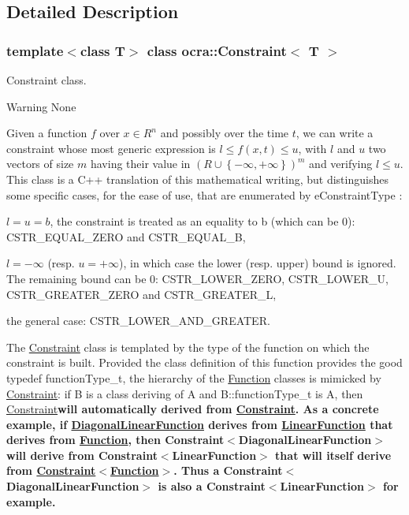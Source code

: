 \subsection{Detailed Description}
\subsubsection*{template$<$class T$>$\newline
class ocra\+::\+Constraint$<$ T $>$}

Constraint class. 

\begin{DoxyWarning}{Warning}
None
\end{DoxyWarning}
Given a function $ f $ over $ x \in R^n $ and possibly over the time $ t $, we can write a constraint whose most generic expression is $ l \le f(x,t) \le u $, with $ l $ and $ u $ two vectors of size $ m $ having their value in $ \left(R\cup\left\{-\infty,+\infty\right\}\right)^m $ and verifying $ l \le u $. This class is a C++ translation of this mathematical writing, but distinguishes some specific cases, for the ease of use, that are enumerated by e\+Constraint\+Type \+:
\begin{DoxyItemize}
\item $ l = u = b $, the constraint is treated as an equality to b (which can be 0)\+: C\+S\+T\+R\+\_\+\+E\+Q\+U\+A\+L\+\_\+\+Z\+E\+RO and C\+S\+T\+R\+\_\+\+E\+Q\+U\+A\+L\+\_\+B,
\item $ l = -\infty $ (resp. $ u = +\infty $), in which case the lower (resp. upper) bound is ignored. The remaining bound can be 0\+: C\+S\+T\+R\+\_\+\+L\+O\+W\+E\+R\+\_\+\+Z\+E\+RO, C\+S\+T\+R\+\_\+\+L\+O\+W\+E\+R\+\_\+U, C\+S\+T\+R\+\_\+\+G\+R\+E\+A\+T\+E\+R\+\_\+\+Z\+E\+RO and C\+S\+T\+R\+\_\+\+G\+R\+E\+A\+T\+E\+R\+\_\+L,
\item the general case\+: C\+S\+T\+R\+\_\+\+L\+O\+W\+E\+R\+\_\+\+A\+N\+D\+\_\+\+G\+R\+E\+A\+T\+ER.
\end{DoxyItemize}

The \hyperlink{classocra_1_1Constraint}{Constraint} class is templated by the type of the function on which the constraint is built. Provided the class definition of this function provides the good typedef function\+Type\+\_\+t, the hierarchy of the \hyperlink{classocra_1_1Function}{Function} classes is mimicked by \hyperlink{classocra_1_1Constraint}{Constraint}\+: if B is a class deriving of A and B\+::function\+Type\+\_\+t is A, then \hyperlink{classocra_1_1Constraint}{Constraint}{\bfseries  will automatically derived from \hyperlink{classocra_1_1Constraint}{Constraint}. As a concrete example, if \hyperlink{classocra_1_1DiagonalLinearFunction}{Diagonal\+Linear\+Function} derives from \hyperlink{classocra_1_1LinearFunction}{Linear\+Function} that derives from \hyperlink{classocra_1_1Function}{Function}, then Constraint$<$\+Diagonal\+Linear\+Function$>$ will derive from Constraint$<$\+Linear\+Function$>$ that will itself derive from \hyperlink{classocra_1_1Constraint_3_01Function_01_4}{Constraint$<$\+Function$>$}. Thus a Constraint$<$\+Diagonal\+Linear\+Function$>$ is also a Constraint$<$\+Linear\+Function$>$ for example.}

